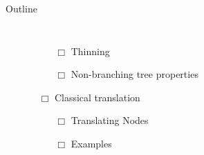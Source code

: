 \documentclass{beamer}
\begin{document}
\begin{frame}{Outline}
\begin{columns}
\begin{itemize}
\begin{itemize}
                \begin{itemize}
                    \item[${\Box}$] {Thinning }
                    \item[${\Box}$] {Non-branching tree properties}
                \end{itemize}
                \item[${\Box}$] {Classical translation}
                \begin{itemize}
                    \item[${\Box}$] {Translating Nodes }
                    \item[${\Box}$] {Examples}
                \end{itemize}
                
            \end{itemize}
        \end{itemize}
    \end{columns}
\end{frame}
\end{document}

